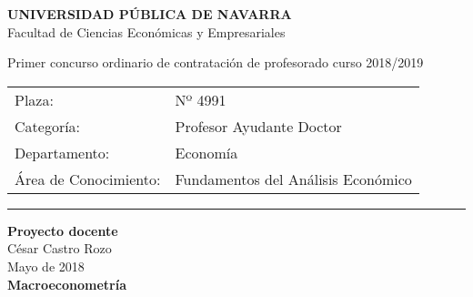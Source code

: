 \documentclass{article}\usepackage[]{graphicx}\usepackage[]{color}
\begin{document}
\begin{center}
\textbf{UNIVERSIDAD PÚBLICA DE NAVARRA}\\
Facultad de Ciencias Económicas y Empresariales
\vspace{10pt}

Primer concurso ordinario de contratación de profesorado curso 2018/2019\\
\begin{tabular}{l l}
Plaza:  & Nº 4991\\
Categoría: & Profesor Ayudante Doctor\\
Departamento: & Economía\\
Área de Conocimiento: & Fundamentos del Análisis Económico\\
\end{tabular}

\textcolor[RGB]{85,87,89}{\rule{\linewidth}{0.4pt}}

\vspace{5pt}

\textbf{Proyecto docente}\\
César Castro Rozo\\
Mayo de 2018\\
\vspace{5pt}
\textbf{Macroeconometría}
\end{center}
\vspace{5pt}
\end{document}
